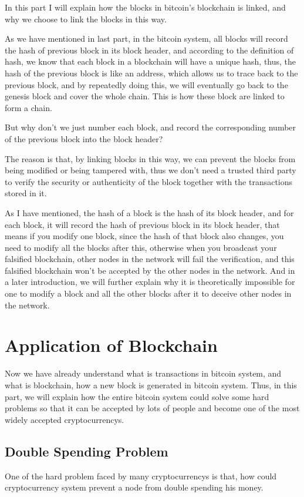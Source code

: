 \documentclass[12pt,a4paper]{article}
\begin{document}
In this part I will explain how the blocks in bitcoin's blockchain is linked, and why we choose to link the blocks in this way.

As we have mentioned in last part, in the bitcoin system, all blocks will record the hash of previous block in its block header, and according to the definition of hash, we know that each block in a blockchain will have a unique hash, thus, the hash of the previous block is like an address, which allows us to trace back to the previous block, and by repeatedly doing this, we will eventually go back to the genesis block and cover the whole chain. This is how these block are linked to form a chain.

But why don't we just number each block, and record the corresponding number of the previous block into the block header?

The reason is that, by linking blocks in this way, we can prevent the blocks from being modified or being tampered with, thus we don't need a trusted third party to verify the security or authenticity of the block together with the transactions stored in it.

As I have mentioned, the hash of a block is the hash of its block header, and for each block, it will record the hash of previous block in its block header, that means if you modify one block, since the hash of that block also changes, you need to modify all the blocks after this, otherwise when you broadcast your falsified blockchain, other nodes in the network will fail the verification, and this falsified blockchain won't be accepted by the other nodes in the network. And in a later introduction, we will further explain why it is theoretically impossible for one to modify a block and all the other blocks after it to deceive other nodes in the network.



\section{Application of Blockchain}

Now we have already understand what is transactions in bitcoin system, and what is blockchain, how a new block is generated in bitcoin system. Thus, in this part, we will explain how the entire bitcoin system could solve some hard problems so that it can be accepted by lots of people and become one of the most widely accepted cryptocurrencys.

\subsection{Double Spending Problem}
One of the hard problem faced by many cryptocurrencys is that, how could cryptocurrency system
 prevent a node from double spending his money.
 
\end{document}
